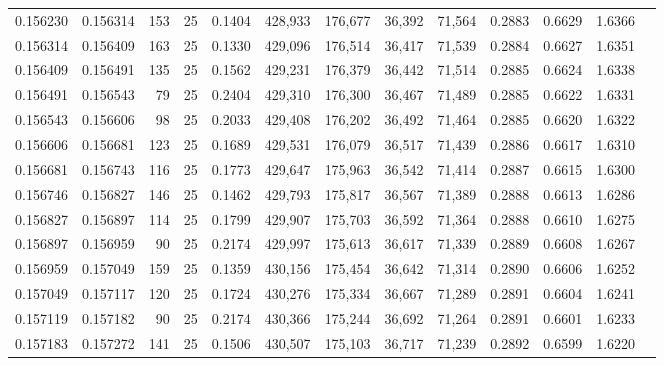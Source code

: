 \begin{tabular}{rrrrrrrrrrrrr}
0.156230 & 0.156314 &   153 &  25 &                                     0.1404 & 428,933 & 176,677 &  36,392 &  71,564 & 0.2883 & 0.6629 & 1.6366 \\
0.156314 & 0.156409 &   163 &  25 &                                     0.1330 & 429,096 & 176,514 &  36,417 &  71,539 & 0.2884 & 0.6627 & 1.6351 \\
0.156409 & 0.156491 &   135 &  25 &                                     0.1562 & 429,231 & 176,379 &  36,442 &  71,514 & 0.2885 & 0.6624 & 1.6338 \\
0.156491 & 0.156543 &    79 &  25 &                                     0.2404 & 429,310 & 176,300 &  36,467 &  71,489 & 0.2885 & 0.6622 & 1.6331 \\
0.156543 & 0.156606 &    98 &  25 &                                     0.2033 & 429,408 & 176,202 &  36,492 &  71,464 & 0.2885 & 0.6620 & 1.6322 \\
0.156606 & 0.156681 &   123 &  25 &                                     0.1689 & 429,531 & 176,079 &  36,517 &  71,439 & 0.2886 & 0.6617 & 1.6310 \\
0.156681 & 0.156743 &   116 &  25 &                                     0.1773 & 429,647 & 175,963 &  36,542 &  71,414 & 0.2887 & 0.6615 & 1.6300 \\
0.156746 & 0.156827 &   146 &  25 &                                     0.1462 & 429,793 & 175,817 &  36,567 &  71,389 & 0.2888 & 0.6613 & 1.6286 \\
0.156827 & 0.156897 &   114 &  25 &                                     0.1799 & 429,907 & 175,703 &  36,592 &  71,364 & 0.2888 & 0.6610 & 1.6275 \\
0.156897 & 0.156959 &    90 &  25 &                                     0.2174 & 429,997 & 175,613 &  36,617 &  71,339 & 0.2889 & 0.6608 & 1.6267 \\
0.156959 & 0.157049 &   159 &  25 &                                     0.1359 & 430,156 & 175,454 &  36,642 &  71,314 & 0.2890 & 0.6606 & 1.6252 \\
0.157049 & 0.157117 &   120 &  25 &                                     0.1724 & 430,276 & 175,334 &  36,667 &  71,289 & 0.2891 & 0.6604 & 1.6241 \\
0.157119 & 0.157182 &    90 &  25 &                                     0.2174 & 430,366 & 175,244 &  36,692 &  71,264 & 0.2891 & 0.6601 & 1.6233 \\
0.157183 & 0.157272 &   141 &  25 &                                     0.1506 & 430,507 & 175,103 &  36,717 &  71,239 & 0.2892 & 0.6599 & 1.6220 \\

\end{tabular}

